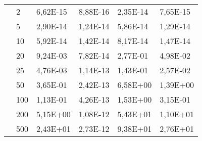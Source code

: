 \begin{longtable}[c]{|p{3.5cm}|l|l|l|l|l|}
                                       & 2         & 6,62E-15 & 8,88E-16 & 2,35E-14 & 7,65E-15 \\ \cline{2-6} 
                                       & 5         & 2,90E-14 & 1,24E-14 & 5,86E-14 & 1,29E-14 \\ \cline{2-6} 
                                       & 10        & 5,92E-14 & 1,42E-14 & 8,17E-14 & 1,47E-14 \\ \cline{2-6} 
                                       & 20        & 9,24E-03 & 7,82E-14 & 2,77E-01 & 4,98E-02 \\ \cline{2-6} 
                                       & 25        & 4,76E-03 & 1,14E-13 & 1,43E-01 & 2,57E-02 \\ \cline{2-6} 
                                       & 50        & 3,65E-01 & 2,42E-13 & 6,58E+00 & 1,39E+00 \\ \cline{2-6} 
                                       & 100       & 1,13E-01 & 4,26E-13 & 1,53E+00 & 3,15E-01 \\ \cline{2-6} 
                                       & 200       & 5,15E+00 & 1,08E-12 & 5,43E+01 & 1,10E+01 \\ \cline{2-6} 
                                       & 500       & 2,43E+01 & 2,73E-12 & 9,38E+01 & 2,76E+01 \\ \hline
\end{longtable}

